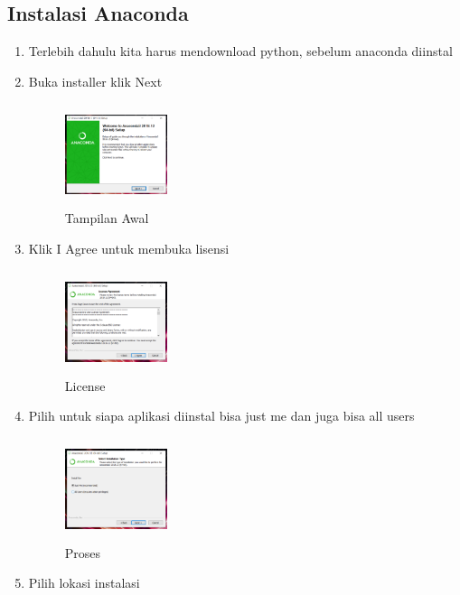 \subsection{Instalasi Anaconda}
\begin{enumerate}
    \item Terlebih dahulu kita harus mendownload python, sebelum anaconda diinstal
    \item Buka installer klik Next
     \begin{figure}[!htbp]
        \centering
        \includegraphics[width=3cm,height=3cm]{figures/felix/1.png}
        \caption{Tampilan Awal}
        \label{awal}
        \end{figure}
    \item Klik I Agree untuk membuka lisensi
     \begin{figure}[!htbp]
        \centering
        \includegraphics[width=3cm,height=3cm]{figures/felix/2.png}
        \caption{License}
        \label{awal}
        \end{figure}
    \item  Pilih untuk siapa aplikasi diinstal bisa just me dan juga bisa all users
     \begin{figure}[!htbp]
        \centering
        \includegraphics[width=3cm,height=3cm]{figures/felix/3.png}
        \caption{Proses}
        \label{awal}
        \end{figure}
    \item  Pilih lokasi instalasi
    \begin{figure}[!htbp]
        \centering

\end{figure}
\end{enumerate}
